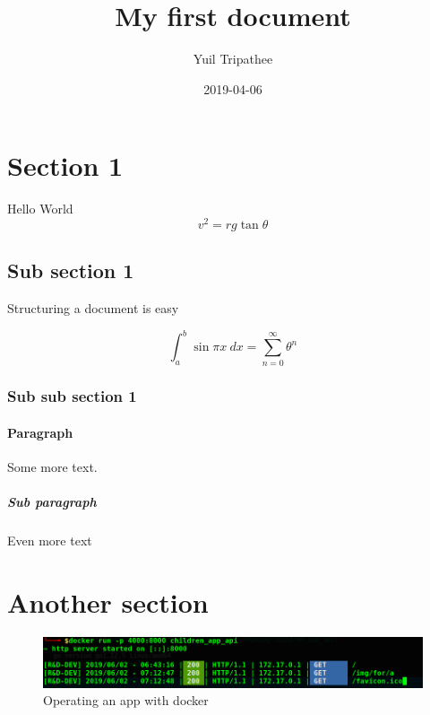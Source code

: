 \documentclass[a4paper]{article}
\title{My first document}
\date{2019-04-06}
\author{Yuil Tripathee}
\begin{document}
	
	\maketitle
	\newpage
	
	\tableofcontents
	\newpage
	
	\listoffigures
	\listoftables
	\newpage
	\section{Section 1}
	
	Hello World
	\[ v^2 = rg\tan \theta \]
	
	\subsection{Sub section 1}
	
	Structuring a document is easy
	
	\begin{equation}\label{key}
	\int_a^b \sin \pi x~dx = \sum_{n=0}^{\infty} \theta^n
	\end{equation}
	
	
	\subsubsection{Sub sub section 1}
	
	\paragraph{Paragraph}
	
	Some more text.
	
	\subparagraph{Sub paragraph}
	
	Even more text
	\newpage
	\section{Another section}
	
	\begin{figure}[H]
		\centering
		\includegraphics[width=\linewidth]{images/docker_app_operation}
		\caption[Operating an app with docker]{Operating an app with docker}
		\label{fig:dockerappoperation}
	\end{figure}
\end{document}
